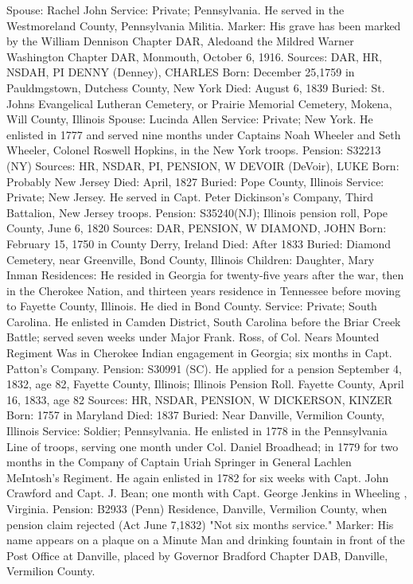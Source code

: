 Spouse: Rachel John 
Service: Private; Pennsylvania. He served in the Westmoreland County, Pennsyl­vania Militia. 
Marker: His grave has been marked by the William Dennison Chapter DAR, Aledoand the Mildred Warner Washington Chapter DAR, Monmouth, October 6, 1916. 
Sources: DAR, HR, NSDAH, PI 
DENNY (Denney), CHARLES
Born: December 25,1759 in Pauldmgstown, Dutchess County, New York
Died: August 6, 1839 Buried: St. Johns Evangelical Lutheran Cemetery, or Prairie Memorial Cemetery, Mokena, Will County, Illinois 
Spouse: Lucinda Allen 
Service: Private; New York. He enlisted in 1777 and served nine months under Captains Noah Wheeler and Seth Wheeler, Colonel Roswell Hopkins, in the New York troops. 
Pension: S32213 (NY) 
Sources: HR, NSDAR, PI, PENSION, W 
DEVOIR (DeVoir), LUKE 
Born: Probably New Jersey 
Died: April, 1827 
Buried: Pope County, Illinois 
Service: Private; New Jersey. He served in Capt. Peter Dickinson's Company, Third Battalion, New Jersey troops. 
Pension: S35240(NJ); Illinois pension roll, Pope County, June 6, 1820 
Sources: DAR, PENSION, W
DIAMOND, JOHN 
Born: February 15, 1750 in County Derry, Ireland 
Died: After 1833 
Buried: Diamond Cemetery, near Greenville, Bond County, Illinois 
Children: Daughter, Mary Inman 
Residences: He resided in Georgia for twenty-five years after the war, then in the Cherokee Nation, and thirteen years residence in Tennessee before moving to Fayette County, Illinois. He died in Bond County. 
Service: Private; South Carolina. He enlisted in Camden District, South Carolina before the Briar Creek Battle; served seven weeks under Major Frank. Ross, of Col. Nears Mounted Regiment Was in Cherokee Indian engagement in Georgia; six months in Capt. Patton's Company. 
Pension: S30991 (SC). He applied for a pension September 4, 1832, age 82, Fayette County, Illinois; Illinois Pension Roll. Fayette County, April 16, 1833, age 82 
Sources: HR, NSDAR, PENSION, W 
DICKERSON, KINZER
Born: 1757 in Maryland 
Died: 1837 
Buried: Near Danville, Vermilion County, Illinois 
Service: Soldier; Pennsylvania. He enlisted in 1778 in the Pennsylvania Line of troops, serving one month under Col. Daniel Broadhead; in 1779 for two months in the Company of Captain Uriah Springer in General Lachlen MeIntosh's Regiment. He again enlisted in 1782 for six weeks with Capt. John Crawford and Capt. J. Bean; one month with Capt. George Jenkins in Wheeling , Virginia. 
Pension: B2933 (Penn) Residence, Danville, Vermilion County, when pension claim rejected (Act June 7,1832) "Not six months service." 
Marker: His name appears on a plaque on a Minute Man and drinking fountain in front of the Post Office at Danville, placed by Governor Bradford Chapter DAB, Danville, Vermilion County.
